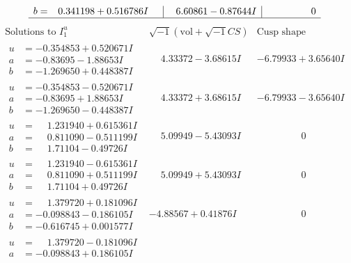 \documentclass[1p]{elsarticle_modified}
\theoremstyle{definition}
\newcommand{\I}{\sqrt{-1}}
\begin{document}
$$\begin{array}{c|c|c}
\begin{aligned}
b &= \phantom{-}0.341198 + 0.516786 I\end{aligned}
 & \phantom{-}6.60861 - 0.87644 I & \phantom{-0.000000 } 0\\
 \hline 
 \end{array}$$\newpage$$\begin{array}{c|c|c}  
\text{Solutions to }I^u_{1}& \I (\text{vol} + \sqrt{-1}CS) & \text{Cusp shape}\\
 \hline 
\begin{aligned}
u &= -0.354853 + 0.520671 I \\
a &= -0.83695 - 1.88653 I \\
b &= -1.269650 + 0.448387 I\end{aligned}
 & \phantom{-}4.33372 - 3.68615 I & -6.79933 + 3.65640 I \\ \hline\begin{aligned}
u &= -0.354853 - 0.520671 I \\
a &= -0.83695 + 1.88653 I \\
b &= -1.269650 - 0.448387 I\end{aligned}
 & \phantom{-}4.33372 + 3.68615 I & -6.79933 - 3.65640 I \\ \hline\begin{aligned}
u &= \phantom{-}1.231940 + 0.615361 I \\
a &= \phantom{-}0.811090 - 0.511199 I \\
b &= \phantom{-}1.71104 - 0.49726 I\end{aligned}
 & \phantom{-}5.09949 - 5.43093 I & \phantom{-0.000000 } 0 \\ \hline\begin{aligned}
u &= \phantom{-}1.231940 - 0.615361 I \\
a &= \phantom{-}0.811090 + 0.511199 I \\
b &= \phantom{-}1.71104 + 0.49726 I\end{aligned}
 & \phantom{-}5.09949 + 5.43093 I & \phantom{-0.000000 } 0 \\ \hline\begin{aligned}
u &= \phantom{-}1.379720 + 0.181096 I \\
a &= -0.098843 - 0.186105 I \\
b &= -0.616745 + 0.001577 I\end{aligned}
 & -4.88567 + 0.41876 I & \phantom{-0.000000 } 0 \\ \hline\begin{aligned}
u &= \phantom{-}1.379720 - 0.181096 I \\
a &= -0.098843 + 0.186105 I \\

\end{aligned}
\end{array}$$
\end{document}
